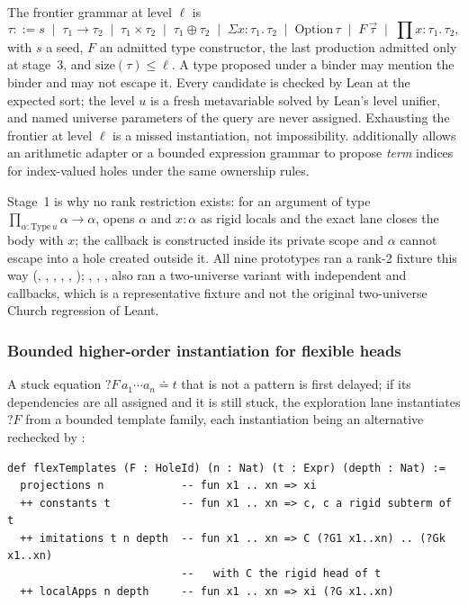 The frontier grammar at level $\ell$ is
\[
 \tau ::= s \;\mid\; \tau_1 \to \tau_2 \;\mid\; \tau_1 \times \tau_2 \;\mid\; \tau_1 \oplus \tau_2 \;\mid\; \Sigma x{:}\tau_1.\,\tau_2 \;\mid\; \mathrm{Option}\,\tau \;\mid\; F\,\vec\tau \;\mid\; \prod x{:}\tau_1.\,\tau_2,
\]
with $s$ a seed, $F$ an admitted type constructor, the last production admitted only at stage~3, and $\mathrm{size}(\tau)\le\ell$. A type proposed under a binder may mention the binder and may not escape it. Every candidate is checked by Lean at the expected sort; the level $u$ is a fresh metavariable solved by Lean's level unifier, and named universe parameters of the query are never assigned. Exhausting the frontier at level $\ell$ is a missed instantiation, not impossibility.  additionally allows an arithmetic adapter or a bounded expression grammar to propose \emph{term} indices for index-valued holes under the same ownership rules.

Stage~1 is why no rank restriction exists: for an argument of type $\prod_{\alpha:\mathrm{Type}\,u}\alpha\to\alpha$,  opens $\alpha$ and $x:\alpha$ as rigid locals and the exact lane closes the body with $x$; the callback is constructed inside its private scope and $\alpha$ cannot escape into a hole created outside it. All nine prototypes ran a rank-2 fixture this way (, , , , , ); , , ,  also ran a two-universe variant with independent  and  callbacks, which is a representative fixture and not the original two-universe Church regression of Leant.

\subsubsection{Bounded higher-order instantiation for flexible heads}

A stuck equation $?F\,a_1\cdots a_n \doteq t$ that is not a pattern is first delayed; if its dependencies are all assigned and it is still stuck, the exploration lane instantiates $?F$ from a bounded template family, each instantiation being an alternative rechecked by :

\begin{lstlisting}
def flexTemplates (F : HoleId) (n : Nat) (t : Expr) (depth : Nat) :=
  projections n            -- fun x1 .. xn => xi
  ++ constants t           -- fun x1 .. xn => c, c a rigid subterm of t
  ++ imitations t n depth  -- fun x1 .. xn => C (?G1 x1..xn) .. (?Gk x1..xn)
                           --   with C the rigid head of t
  ++ localApps n depth     -- fun x1 .. xn => xi (?G x1..xn)
\end{lstlisting}

